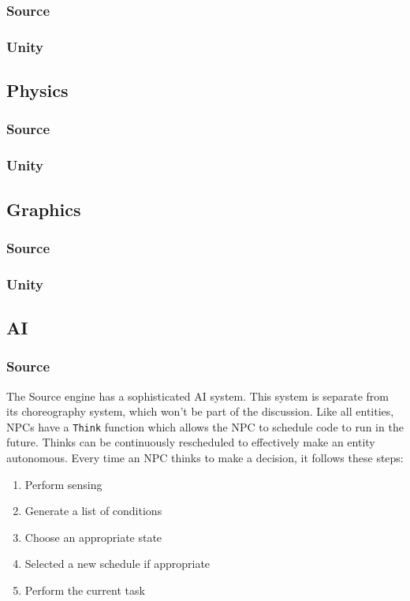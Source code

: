 \documentclass[a4paper, 12pt]{scrartcl}
\begin{document}
\subsubsection{Source}
\subsubsection{Unity}

\subsection{Physics}
\subsubsection{Source}
\subsubsection{Unity}

\subsection{Graphics}
\subsubsection{Source}
\subsubsection{Unity}

\subsection{AI}
\subsubsection{Source}
The Source engine has a sophisticated AI system. This system is separate from its choreography system, which won't be part of the discussion. Like all entities, NPCs have a \texttt{Think} function which allows the NPC to schedule code to run in the future. Thinks can be continuously rescheduled to effectively make an entity autonomous. Every time an NPC thinks to make a decision, it follows these steps:

\begin{enumerate}
  \item Perform sensing
  \item Generate a list of conditions
  \item Choose an appropriate state
  \item Selected a new schedule if appropriate
  \item Perform the current task
\end{enumerate}
\end{document}
